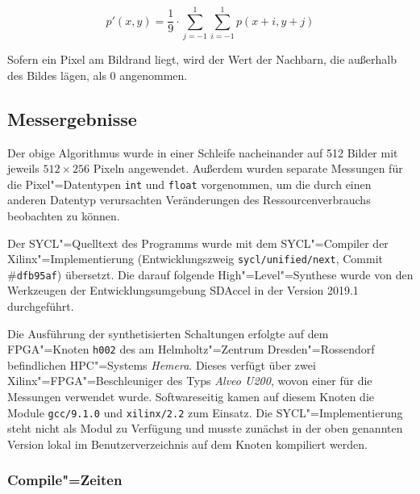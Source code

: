 \begin{equation}
    p'(x, y) = \frac{1}{9} \cdot \sum_{j = {-1}}^{1} \sum_{i = {-1}}^{1} p(x + i, y + j)
\end{equation}

Sofern ein Pixel am Bildrand liegt, wird der Wert der Nachbarn, die außerhalb
des Bildes lägen, als $0$ angenommen.

\subsection{Messergebnisse}

Der obige Algorithmus wurde in einer Schleife nacheinander auf \num{512} Bilder
mit jeweils $512 \times 256$ Pixeln angewendet. Außerdem wurden separate
Messungen für die Pixel"=Datentypen \texttt{int} und \texttt{float}
vorgenommen, um die durch einen anderen Datentyp verursachten Veränderungen des
Ressourcenverbrauchs beobachten zu können.

Der SYCL"=Quelltext des Programms wurde mit dem SYCL"=Compiler der
Xilinx"=Implementierung (Entwicklungszweig \texttt{sycl/unified/next},
Commit \#\texttt{dfb95af}) übersetzt. Die darauf folgende High"=Level"=Synthese
wurde von den Werkzeugen der Entwicklungsumgebung SDAccel in der Version 2019.1
durchgeführt.

Die Ausführung der synthetisierten Schaltungen erfolgte auf dem FPGA"=Knoten
\texttt{h002} des am Helmholtz"=Zentrum Dresden"=Rossendorf befindlichen
HPC"=Systems \textit{Hemera}. Dieses verfügt über zwei
Xilinx"=FPGA"=Beschleuniger des Typs \textit{Alveo U200}, wovon einer für die
Messungen verwendet wurde. Softwareseitig kamen auf diesem Knoten die Module
\texttt{gcc/9.1.0} und \texttt{xilinx/2.2} zum Einsatz. Die
SYCL"=Implementierung steht nicht als Modul zu Verfügung und musste zunächst
in der oben genannten Version lokal im Benutzerverzeichnis auf dem Knoten
kompiliert werden.

\subsubsection{Compile"=Zeiten}

